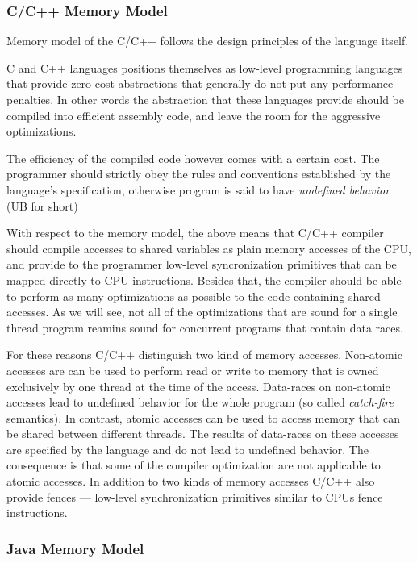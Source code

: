 \documentclass[a4paper,twoside,11pt]{article}
\numberwithin{equation}{section}
\begin{document}
\subsubsection{C/C++ Memory Model}

Memory model of the C/C++ follows the design principles of the language itself.

C and C++ languages positions themselves as low-level programming languages
that provide zero-cost abstractions that generally do not put any performance penalties. 
In other words the abstraction that these languages provide 
should be compiled into efficient assembly code,
and leave the room for the aggressive optimizations.

The efficiency of the compiled code however comes with a certain cost.
The programmer should strictly obey the rules and conventions
established by the language's specification, 
otherwise program is said to have \emph{undefined behavior} (UB for short)

With respect to the memory model, the above means that C/C++ compiler should
compile accesses to shared variables as plain memory accesses of the CPU,
and provide to the programmer low-level syncronization primitives
that can be mapped directly to CPU instructions.
Besides that, the compiler should be able to perform 
as many optimizations as possible to the code containing shared accesses.
As we will see, not all of the optimizations that are sound 
for a single thread program reamins sound for concurrent programs that contain data races. 

For these reasons C/C++ distinguish two kind of memory accesses.
Non-atomic accesses are can be used to perform read or write to memory that 
is owned exclusively by one thread at the time of the access.
Data-races on non-atomic accesses lead to undefined behavior for the whole program
(so called \emph{catch-fire} semantics).
In contrast, atomic accesses can be used to access memory that can be shared between different threads. 
The results of data-races on these accesses are specified by the language and do not lead to undefined behavior.
The consequence is that some of the compiler optimization are not applicable to atomic accesses.
In addition to two kinds of memory accesses C/C++ also provide fences ---
low-level synchronization primitives similar to CPUs fence instructions.

\subsubsection{Java Memory Model}
\end{document}
